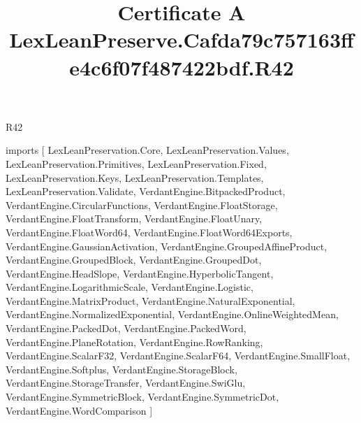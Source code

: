 \begin{lexlean}{R42}
\title{Certificate A LexLeanPreserve.Cafda79c757163ffe4c6f07f487422bdf.R42}
\begin{coremodule}
imports [
  LexLeanPreservation.Core,
  LexLeanPreservation.Values,
  LexLeanPreservation.Primitives,
  LexLeanPreservation.Fixed,
  LexLeanPreservation.Keys,
  LexLeanPreservation.Templates,
  LexLeanPreservation.Validate,
  VerdantEngine.BitpackedProduct,
  VerdantEngine.CircularFunctions,
  VerdantEngine.FloatStorage,
  VerdantEngine.FloatTransform,
  VerdantEngine.FloatUnary,
  VerdantEngine.FloatWord64,
  VerdantEngine.FloatWord64Exports,
  VerdantEngine.GaussianActivation,
  VerdantEngine.GroupedAffineProduct,
  VerdantEngine.GroupedBlock,
  VerdantEngine.GroupedDot,
  VerdantEngine.HeadSlope,
  VerdantEngine.HyperbolicTangent,
  VerdantEngine.LogarithmicScale,
  VerdantEngine.Logistic,
  VerdantEngine.MatrixProduct,
  VerdantEngine.NaturalExponential,
  VerdantEngine.NormalizedExponential,
  VerdantEngine.OnlineWeightedMean,
  VerdantEngine.PackedDot,
  VerdantEngine.PackedWord,
  VerdantEngine.PlaneRotation,
  VerdantEngine.RowRanking,
  VerdantEngine.ScalarF32,
  VerdantEngine.ScalarF64,
  VerdantEngine.SmallFloat,
  VerdantEngine.Softplus,
  VerdantEngine.StorageBlock,
  VerdantEngine.StorageTransfer,
  VerdantEngine.SwiGlu,
  VerdantEngine.SymmetricBlock,
  VerdantEngine.SymmetricDot,
  VerdantEngine.WordComparison
]


\end{coremodule}
\end{lexlean}
